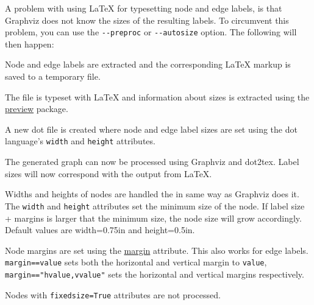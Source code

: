 \documentclass[10pt,a4paper,english]{article}
\newlength{\admonitionwidth}
\begin{document}
A problem with using LaTeX for typesetting node and edge labels, is that Graphviz does not know the sizes of the resulting labels. To circumvent this problem, you can use the \texttt{-{}-preproc} or \texttt{-{}-autosize} option. The following will then happen:
\begin{list}{.}
{
\setlength{\rightmargin}{\leftmargin}
}
\item {} 
Node and edge labels are extracted and the corresponding LaTeX markup is saved to a temporary file.

\item {} 
The file is typeset with LaTeX and information about sizes is extracted using the \href{http://www.ctan.org/tex-archive/help/Catalogue/entries/preview.html}{preview} package.

\item {} 
A new dot file is created where node and edge label sizes are set using the dot language's \texttt{width} and \texttt{height} attributes.

\item {} 
The generated graph can now be processed using Graphviz and dot2tex. Label sizes will now correspond with the output from LaTeX.

\end{list}

Widths and heights of nodes are handled the in same way as Graphviz does it. The \texttt{width} and \texttt{height} attributes set the minimum size of the node. If label size + margins is larger that the minimum size, the node size will grow accordingly. Default values are width=0.75in and height=0.5in.

Node margins are set using the \href{http://graphviz.org/doc/info/attrs.html\#d:margin}{margin} attribute. This also works for edge labels. \texttt{margin==value} sets both the horizontal and vertical margin to \texttt{value}, \texttt{margin=="hvalue,vvalue"} sets the horizontal and vertical margins respectively.
\begin{center}\begin{sffamily}
\end{sffamily}
\end{center}


Nodes with \texttt{fixedsize=True} attributes are not processed.
\end{document}
